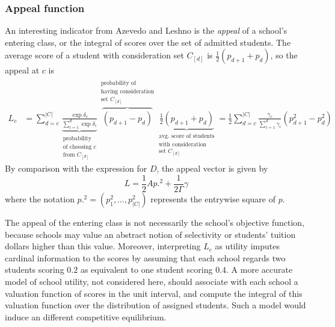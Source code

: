 \documentclass[12pt]{article}
\numberwithin{equation}{subsection}
\theoremstyle{definition}
\begin{document}
\subsubsection{Appeal function}
An interesting indicator from Azevedo and Leshno \parencite*{supplydemandfw} is the \emph{appeal} of a school's entering class, or the integral of scores over the set of admitted students. The average score of a student with consideration set $C_{[d]}$ is $\frac{1}{2}\left(p_{d+1} + p_d\right)$, so the appeal at $c$ is
\begin{align}
L_c &= \sum_{d=c}^{|C|} 
\underbrace{\frac{\exp{\delta_c}}{ \sum_{i=1}^d \exp{\delta_i}}}_{\substack{\text{probability} \\ \text{of choosing } c \\ \text{from }C_{[d]}}} 
\overbrace{\left(p_{d+1} - p_{d}\right)}^{\substack{\text{probability of}\\ \text{having consideration} \\ \text{set }C_{[d]}}} 
\underbrace{\frac{1}{2}\left(p_{d+1} + p_{d}\right)}_{\substack{\text{avg. score of students}\\ \text{with consideration} \\ \text{set }C_{[d]}}}
=\frac{1}{2}\sum_{d=c}^{|C|} 
\frac{{\gamma_c}}{ \sum_{i=1}^d {\gamma_i}} 
\left(p_{d+1}^2 -  p_{d}^2\right)
\end{align}
By comparison with the expression for $D$, the appeal vector is given by 
\[L = \frac{1}{2} A p.^2 + \frac{1}{2\Gamma} \gamma\]
where the notation $p.^2 = (p_1^2, \dots, p_{|C|}^2)$ represents the entrywise square of $p$.

The appeal of the entering class is not necessarily the school's objective function, because schools may value an abstract notion of selectivity or students' tuition dollars higher than this value. Moreover, interpreting $L_c$ as utility imputes cardinal information to the scores by assuming that each school regards two students scoring $0.2$ as equivalent to one student scoring $0.4$. A more accurate model of school utility, not considered here, should associate with each school a valuation function of scores in the unit interval, and compute the integral of this valuation function over the distribution of assigned students. Such a model would induce an different competitive equilibrium.
\end{document}
